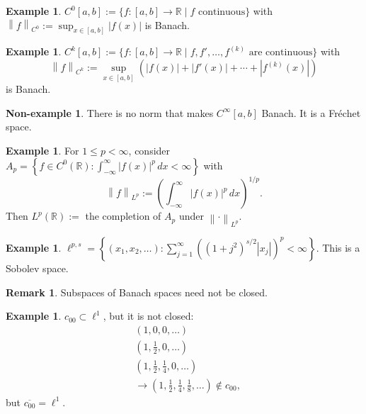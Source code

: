 \documentclass[12pt]{article}
\newcommand{\abs}[1]{\left| #1 \right|}
\newcommand{\norm}[1]{\left\| #1 \right\|}
\newcommand{\R}{\mathbb{R}}
\theoremstyle{definition}
\newtheorem{ex}[thm]{Example}
\newtheorem{nonex}[thm]{Non-example}
\newtheorem{rmk}[thm]{Remark}
\begin{document}
\begin{ex}
	$C^0[a,b] := \lbrace f : [a,b] \to \R \mid f \text{ continuous} \rbrace$ with $\norm{f}_{C^0} := \sup_{x \in [a,b]} \abs{f(x)}$ is Banach.
\end{ex}

\begin{ex}
	$C^k[a,b] := \lbrace f : [a,b] \to \R \mid f, f', \dots, f^{(k)} \text{ are continuous} \rbrace$ with
	\begin{equation*}
		\norm{f}_{C^k} := \sup_{x \in [a,b]} \left( \abs{f(x)} + \abs{f'(x)} + \cdots + \abs{f^{(k)}(x)} \right)
	\end{equation*}
	is Banach.
\end{ex}

\begin{nonex}
	There is no norm that makes $C^\infty[a,b]$ Banach.
	It is a Fr\'echet space.
\end{nonex}

\begin{ex}
	For $1 \leq p < \infty$, consider $A_p = \left\lbrace f \in C^0(\R) : \int_{-\infty}^\infty \abs{f(x)}^p \, dx < \infty \right\rbrace$ with
	\begin{equation*}
		\norm{f}_{L^p} := \left( \int_{-\infty}^\infty \abs{f(x)}^p \, dx \right)^{1/p}.
	\end{equation*}
	Then $L^p(\R) :=$ the completion of $A_p$ under $\norm{\cdot}_{L^p}$.
\end{ex}

\begin{ex}
	$\ell^{p,s} = \left\lbrace (x_1, x_2, \dots) : \sum_{j=1}^\infty \left( (1+j^2)^{s/2} \abs{x_j} \right)^p < \infty \right\rbrace$.
	This is a Sobolev space.
\end{ex}

\begin{rmk}
	Subspaces of Banach spaces need not be closed.
\end{rmk}

\begin{ex}
	$c_{00} \subset \ell^1$, but it is not closed:
	\begin{align*}
		&(1,0,0,\dots) \\
		&(1,\tfrac{1}{2},0,\dots) \\
		&(1,\tfrac{1}{2},\tfrac{1}{4},0,\dots) \\
		&\to (1,\tfrac{1}{2},\tfrac{1}{4},\tfrac{1}{8},\dots) \notin c_{00},
	\end{align*}
	but $\overline{c_{00}} = \ell^1$.
\end{ex}
\end{document}
